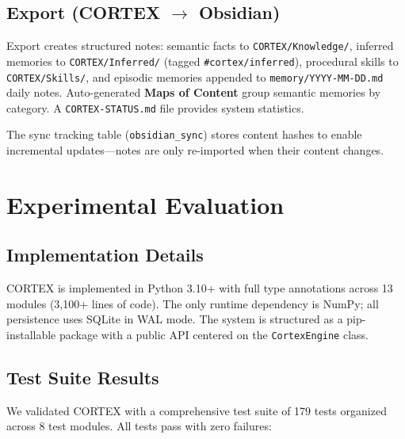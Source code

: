 \documentclass[runningheads]{llncs}
\begin{document}
\subsection{Export (CORTEX $\rightarrow$ Obsidian)}

Export creates structured notes: semantic facts to \texttt{CORTEX/Knowledge/}, inferred memories to \texttt{CORTEX/Inferred/} (tagged \texttt{\#cortex/inferred}), procedural skills to \texttt{CORTEX/Skills/}, and episodic memories appended to \texttt{memory/YYYY-MM-DD.md} daily notes. Auto-generated \textbf{Maps of Content} group semantic memories by category. A \texttt{CORTEX-STATUS.md} file provides system statistics.

The sync tracking table (\texttt{obsidian\_sync}) stores content hashes to enable incremental updates---notes are only re-imported when their content changes.

\section{Experimental Evaluation}\label{sec:eval}

\subsection{Implementation Details}

CORTEX is implemented in Python 3.10+ with full type annotations across 13 modules (3,100+ lines of code). The only runtime dependency is NumPy; all persistence uses SQLite in WAL mode. The system is structured as a pip-installable package with a public API centered on the \texttt{CortexEngine} class.

\subsection{Test Suite Results}

We validated CORTEX with a comprehensive test suite of 179 tests organized across 8 test modules. All tests pass with zero failures:
\end{document}
